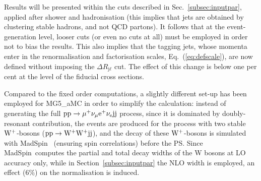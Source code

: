 \documentclass[twocolumn,epjc3]{svjour3} %
\newcommand{\Pl}{\ell}
\newcommand{\Pj}{\ensuremath{\text{j}}\xspace}
\newlength{\width}
\begin{document}
Results will be presented within the cuts described in Sec.~\ref{subsec:inputpar}, applied after shower and hadronisation (this implies that jets
are obtained by clustering stable hadrons, and not QCD partons). It follows that at the event-generation level, looser cuts (or even no cuts at all)
must be employed in order not to bias the results. This also implies that the tagging jets, whose momenta enter in the 
renormalisation and factorisation scales, Eq.~(\ref{eq:defscale}), are now defined without imposing
the $\Delta R_{\Pj\Pl}$ cut. The effect of this change is below one per cent at the level of the fiducial cross sections.

Compared to the fixed order computations, a slightly different set-up has been employed for {\sc MG5\_aMC} in order to simplify the calculation: instead of generating the full
${\rm p}{\rm p}\to\mu^+\nu_\mu{\rm e}^+\nu_{\rm e}{\rm j}{\rm j}$ process, since it is dominated by doubly-resonant contribution, the
events are produced for the process with two stable ${\rm W}^+$-bosons (${\rm p}{\rm p}\to{\rm W^+}{\rm W^+}{\rm j}{\rm j}$), and the decay of these ${\rm W}^+$-bosons
is simulated with {\sc MadSpin}~\cite{Artoisenet:2012st} (ensuring spin correlations) before the PS. Since {\sc MadSpin}\ computes
the partial and total decay widths of the W bosons at LO accuracy only, while in Section~\ref{subsec:inputpar} the NLO width is employed,
an effect ($6\%$) on the normalisation is induced. 
\end{document}
